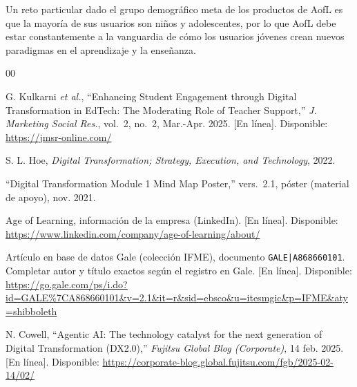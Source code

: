 \documentclass[conference]{IEEEtran}
\begin{document}
Un reto particular dado el grupo demográfico meta de los productos de AofL es que la mayoría de sus usuarios son niños y adolescentes, por lo que AofL debe estar constantemente a la vanguardia de cómo los usuarios jóvenes crean nuevos paradigmas en el aprendizaje y la enseñanza.
\begin{thebibliography}{00}

G. Kulkarni \emph{et al.}, ``Enhancing Student Engagement through Digital Transformation in EdTech: The Moderating Role of Teacher Support,'' \emph{J. Marketing Social Res.}, vol.~2, no.~2, Mar.-Apr. 2025. [En línea]. Disponible: \url{https://jmsr-online.com/}

S. L. Hoe, \emph{Digital Transformation; Strategy, Execution, and Technology}, 2022.

``Digital Transformation Module 1 Mind Map Poster,'' vers.~2.1, póster (material de apoyo), nov. 2021.

Age of Learning, información de la empresa (LinkedIn). [En línea]. Disponible: \url{https://www.linkedin.com/company/age-of-learning/about/}

Artículo en base de datos Gale (colección IFME), documento \texttt{GALE|A868660101}. Completar autor y título exactos según el registro en Gale. [En línea]. Disponible: \url{https://go.gale.com/ps/i.do?id=GALE%7CA868660101&v=2.1&it=r&sid=ebsco&u=itesmgic&p=IFME&aty=shibboleth}

N. Cowell, ``Agentic AI: The technology catalyst for the next generation of Digital Transformation (DX2.0),'' \emph{Fujitsu Global Blog (Corporate)}, 14 feb. 2025. [En línea]. Disponible: \url{https://corporate-blog.global.fujitsu.com/fgb/2025-02-14/02/}

\end{thebibliography}
\end{document}
